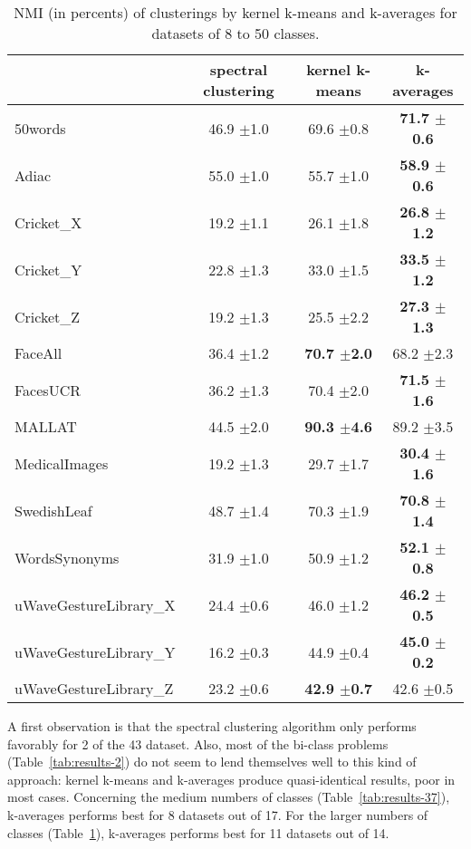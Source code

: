 \documentclass[10pt,letterpaper]{article}
\begin{document}
\begin{table}
\begin{center}
\caption{NMI (in percents) of clusterings by kernel k-means and k-averages for datasets of 8 to 50 classes.}
\label{tab:results-8}
\begin{tabular}{lccc}
 & spectral clustering & kernel k-means & k-averages \\
\hline
50words & 46.9 $\pm$1.0 & 69.6 $\pm$0.8 & \textbf{71.7 $\pm$0.6} \\
Adiac & 55.0 $\pm$1.0 & 55.7 $\pm$1.0 & \textbf{58.9 $\pm$0.6} \\
Cricket\_X & 19.2 $\pm$1.1 & 26.1 $\pm$1.8 & \textbf{26.8 $\pm$1.2} \\
Cricket\_Y & 22.8 $\pm$1.3 & 33.0 $\pm$1.5 & \textbf{33.5 $\pm$1.2} \\
Cricket\_Z & 19.2 $\pm$1.3 & 25.5 $\pm$2.2 & \textbf{27.3 $\pm$1.3} \\
FaceAll & 36.4 $\pm$1.2 & \textbf{70.7 $\pm$2.0} & 68.2 $\pm$2.3 \\
FacesUCR & 36.2 $\pm$1.3 & 70.4 $\pm$2.0 & \textbf{71.5 $\pm$1.6} \\
MALLAT & 44.5 $\pm$2.0 & \textbf{90.3 $\pm$4.6} & 89.2 $\pm$3.5 \\
MedicalImages & 19.2 $\pm$1.3 & 29.7 $\pm$1.7 & \textbf{30.4 $\pm$1.6} \\
SwedishLeaf & 48.7 $\pm$1.4 & 70.3 $\pm$1.9 & \textbf{70.8 $\pm$1.4} \\
WordsSynonyms & 31.9 $\pm$1.0 & 50.9 $\pm$1.2 & \textbf{52.1 $\pm$0.8} \\
uWaveGestureLibrary\_X & 24.4 $\pm$0.6 & 46.0 $\pm$1.2 & \textbf{46.2 $\pm$0.5} \\
uWaveGestureLibrary\_Y & 16.2 $\pm$0.3 & 44.9 $\pm$0.4 & \textbf{45.0 $\pm$0.2} \\
uWaveGestureLibrary\_Z & 23.2 $\pm$0.6 & \textbf{42.9 $\pm$0.7} & 42.6 $\pm$0.5 \\
\end{tabular}
\end{center}
\end{table}

A first observation is that the spectral clustering algorithm only performs favorably for 2 of the 43 dataset. Also, most of the bi-class problems (Table~\ref{tab:results-2}) do not seem to lend themselves well to this kind of approach: kernel k-means and k-averages produce quasi-identical results, poor in most cases. Concerning the medium numbers of classes (Table~\ref{tab:results-37}), k-averages performs best for 8 datasets out of 17. For the larger numbers of classes (Table~\ref{tab:results-8}), k-averages performs best for 11 datasets out of 14.
\end{document}
